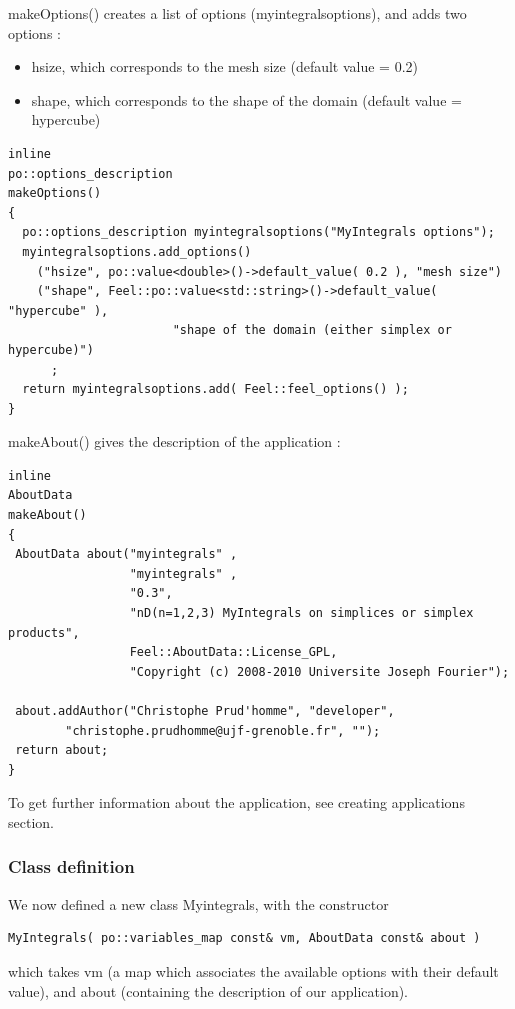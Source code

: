 makeOptions() creates a list of options (myintegralsoptions), and adds two options :
\begin{itemize}
\item hsize, which corresponds to the mesh size (default value = 0.2)
\item shape, which corresponds to the shape of the domain (default value = hypercube)
\end{itemize}
\begin{lstlisting}
inline
po::options_description
makeOptions()
{
  po::options_description myintegralsoptions("MyIntegrals options");
  myintegralsoptions.add_options()
    ("hsize", po::value<double>()->default_value( 0.2 ), "mesh size")
    ("shape", Feel::po::value<std::string>()->default_value( "hypercube" ),
                       "shape of the domain (either simplex or hypercube)")
      ;
  return myintegralsoptions.add( Feel::feel_options() );
}
\end{lstlisting}
\vspace{0.2cm}
makeAbout() gives the description of the application :\\
\begin{lstlisting}
inline
AboutData
makeAbout()
{
 AboutData about("myintegrals" ,
                 "myintegrals" ,
                 "0.3",
                 "nD(n=1,2,3) MyIntegrals on simplices or simplex products",
                 Feel::AboutData::License_GPL,
                 "Copyright (c) 2008-2010 Universite Joseph Fourier");

 about.addAuthor("Christophe Prud'homme", "developer",
        "christophe.prudhomme@ujf-grenoble.fr", "");
 return about;
}
\end{lstlisting}
\vspace{0.2cm}

To get further information about the application, see creating applications section.

\subsubsection{Class definition}

We now defined a new class Myintegrals, with the constructor \\
\begin{lstlisting}
MyIntegrals( po::variables_map const& vm, AboutData const& about )
\end{lstlisting}
which takes vm (a map which associates the available options with their default value), and about (containing the description of our application). \\

